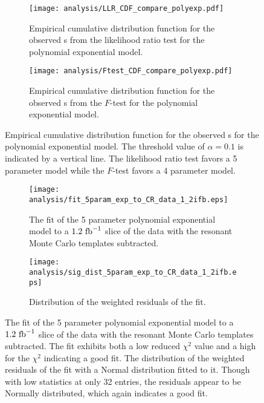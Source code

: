 \begin{figure}[htbp]
 \centering
 \begin{subfigure}[t]{0.48\textwidth}
  \centering
  \texttt{[image: analysis/LLR\_CDF\_compare\_polyexp.pdf]}
  \caption[Empirical cumulative distribution function from the likelihood ratio test comparison for the polynomial exponential fit models.]{%
   Empirical cumulative distribution function for the observed \pvalue{}s from the likelihood ratio test for the polynomial exponential model.}
  \label{fig:LLR_CDF}
 \end{subfigure}%
 \quad
 \begin{subfigure}[t]{0.48\textwidth}
  \centering
  \texttt{[image: analysis/Ftest\_CDF\_compare\_polyexp.pdf]}
  \caption[Empirical cumulative distribution function from the $F$-test comparison for the polynomial exponential fit models.]{%
   Empirical cumulative distribution function for the observed \pvalue{}s from the $F$-test for the polynomial exponential model.}
  \label{fig:Ftest_CDF}
 \end{subfigure}
 \caption{Empirical cumulative distribution function for the observed \pvalue{}s for the polynomial exponential model.
  The threshold value of $\alpha=0.1$ is indicated by a vertical line.
  The likelihood ratio test favors a 5 parameter model while the $F$-test favors a 4 parameter model.}
 \label{fig:empirical_CDF_polyexp}
\end{figure}

\begin{figure}[htbp]
 \centering
 \begin{subfigure}[t]{0.48\textwidth}
  \centering
  \texttt{[image: analysis/fit\_5param\_exp\_to\_CR\_data\_1\_2ifb.eps]}
  \caption[The fit of the 5 parameter polynomial exponential model to a slice of the \CRQCD{} data.]{%
   The fit of the 5 parameter polynomial exponential model to a $1.2~\mathrm{fb}^{-1}$ slice of the \CRQCD{} data with the resonant Monte Carlo templates subtracted.}
  \label{fig:5param_model_fit}
 \end{subfigure}%
 \quad
 \begin{subfigure}[t]{0.48\textwidth}
  \centering
  \texttt{[image: analysis/sig\_dist\_5param\_exp\_to\_CR\_data\_1\_2ifb.eps]}
  \caption[Distribution of the weighted residuals of the fit.]{%
   Distribution of the weighted residuals of the fit.}
  \label{fig:5param_model_sig_dist}
 \end{subfigure}
 \caption[The fit and fit residuals of the 5 parameter polynomial exponential model to a slice of the \CRQCD{} data.]{%
  The fit of the 5 parameter polynomial exponential model to a $1.2~\mathrm{fb}^{-1}$ slice of the \CRQCD{} data with the resonant Monte Carlo templates subtracted.
  The fit exhibits both a low reduced $\chi^{2}$ value and a high \pvalue{} for the $\chi^{2}$ indicating a good fit.
  The distribution of the weighted residuals of the fit with a Normal distribution fitted to it.
  Though with low statistics at only 32 entries, the residuals appear to be Normally distributed, which again indicates a good fit.}
 \label{fig:5param_QCD_model_fit}
\end{figure}

